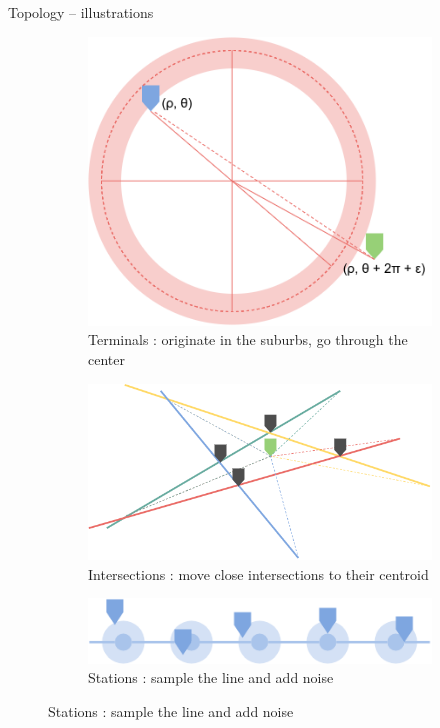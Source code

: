 \begin{frame}{Topology -- illustrations}
	\begin{figure}
		\centering
		\captionsetup{justification=centering}
			
		\begin{subfigure}[t]{.3\textwidth}
			\centering
			\includegraphics[width=0.8\linewidth]{images/create_line.png}
			\caption{Terminals : originate in the suburbs, go through the center}
		\end{subfigure}\qquad%
		\begin{subfigure}[t]{.3\textwidth}
			\centering
			\includegraphics[width=\linewidth]{images/glue_intersections.png}
			\caption{Intersections : move close intersections to their centroid}
		\end{subfigure}\qquad%
		\begin{subfigure}[t]{.3\textwidth}
			\centering
			\includegraphics[width=\linewidth]{images/station_creation.png}
			\caption{Stations : sample the line and add noise}
		\end{subfigure}
	\end{figure}
\end{frame}

